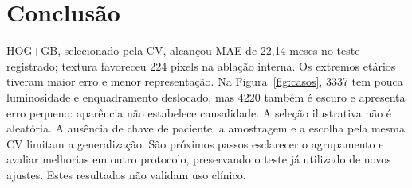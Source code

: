 \documentclass[12pt]{article}
\begin{document}
\newpage
\section{Conclusão}
HOG+GB, selecionado pela CV, alcançou MAE de 22,14 meses no teste registrado; textura favoreceu 224 pixels na ablação interna. Os extremos etários tiveram maior erro e menor representação. Na Figura~\ref{fig:casos}, 3337 tem pouca luminosidade e enquadramento deslocado, mas 4220 também é escuro e apresenta erro pequeno: aparência não estabelece causalidade. A seleção ilustrativa não é aleatória. A ausência de chave de paciente, a amostragem e a escolha pela mesma CV limitam a generalização. São próximos passos esclarecer o agrupamento e avaliar melhorias em outro protocolo, preservando o teste já utilizado de novos ajustes. Estes resultados não validam uso clínico.
\end{document}
